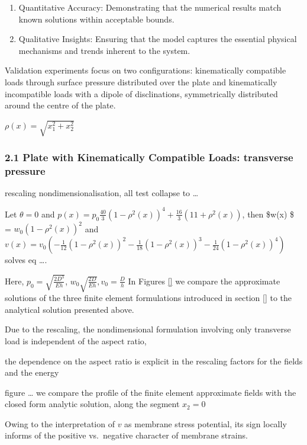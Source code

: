 \documentclass[
  11pt,
]{article}
\providecommand{\tightlist}{%
  \setlength{\itemsep}{0pt}\setlength{\parskip}{0pt}}
\begin{document}
\begin{enumerate}
\def\labelenumi{\arabic{enumi}.}
\tightlist
\item
  Quantitative Accuracy: Demonstrating that the numerical results match
  known solutions within acceptable bounds.
\item
  Qualitative Insights: Ensuring that the model captures the essential
  physical mechanisms and trends inherent to the system.
\end{enumerate}

Validation experiments focus on two configurations: kinematically
compatible loads through surface pressure distributed over the plate and
kinematically incompatible loads with a dipole of disclinations,
symmetrically distributed around the centre of the plate.

\(\rho(x) = \sqrt{x_1^2 + x_2^2}\)

\subsubsection{2.1 Plate with Kinematically Compatible Loads: transverse
pressure}\label{plate-with-kinematically-compatible-loads-transverse-pressure}

rescaling nondimensionalisation, all test collapse to \ldots{}

Let \(\theta = 0\) and
\(p(x)  = p_0\frac{40}{3} (1 - \rho^2(x) )^4 + \frac{16}{3} (11 + \rho^2(x) )\),
then \$w(x) \$ = \(w_0 (1 - \rho^2(x) )^2\) and
\(v(x) =v_0  (-\frac{1}{12} (1 - \rho^2(x) )^2 -\frac{1}{18} (1 - \rho^2(x) )^3 -\frac{1}{24} (1 - \rho^2(x) )^4)\)
solves eq \ldots.

Here, \(p_0=\sqrt{\frac{2D^3}{E h}}\),
\(w_0\sqrt{\frac{2D}{E h}}, v_0 =\frac{D}{h}\) In Figures \ref{} we
compare the approximate solutions of the three finite element
formulations introduced in section \ref{} to the analytical solution
presented above.

Due to the rescaling, the nondimensional formulation involving only
transverse load is independent of the aspect ratio,

the dependence on the aspect ratio is explicit in the rescaling factors
for the fields and the energy

figure \ldots{} we compare the profile of the finite element approximate
fields with the closed form analytic solution, along the segment
\(x_2 = 0\)

Owing to the interpretation of \(v\) as membrane stress potential, its
sign locally informs of the positive vs.~negative character of membrane
strains.
\end{document}
